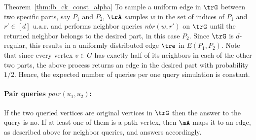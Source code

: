 \begin{proofof}{Theorem~\ref{thm:lb_ck_const_alpha}}
    To sample a uniform edge in $\trG$ between two specific parts, say $P_1$ and $P_2$,  $\trA$ samples $w$ in the set of indices of $P_1$ and $r'\in [d]$ u.a.r. and performs  neighbor queries $nbr(w,r')$ on $\trG$ until the returned neighbor belongs to the desired part, in this case $P_2$. 
    Since $\trG$ is $d$-regular, this results in a uniformly distributed edge $\tre$ in $E(P_1,P_2)$. Note that since every vertex $v\in G$ has exactly half of its neighbors in each of the other two parts, the above process returns an edge in the desired part with probability $1/2$. Hence, the expected number of queries per one query simulation  is constant.

    
    \paragraph{Pair queries $pair(u_1,u_2)$:} 
    If the two queried vertices are original vertices in $\trG$ then the answer to the query is no. If at least one of them is a path vertex, then $\mA$ maps it to an edge, as described above for neighbor queries, and answers accordingly.

\end{proofof}
